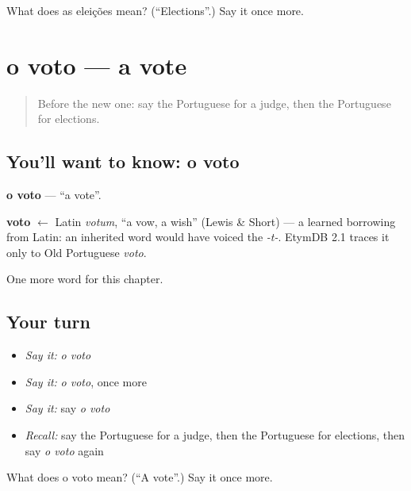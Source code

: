 \begin{tcolorbox}[breakable,colback=teal!4,colframe=teal!35!black,title={Before you move on}]
What does as eleições mean? (\textquotedblleft{}Elections\textquotedblright{}.) Say it once more.
\end{tcolorbox}
\section[o voto]{o voto — a vote}

\label{lesson:PT-C189-voto}



\begin{quote}
Before the new one: say the Portuguese for a judge, then the Portuguese for elections.
\end{quote}

\subsection*{You'll want to know: o voto}
\textbf{o voto} — \textquotedblleft{}a vote\textquotedblright{}.

\begin{cousinweb}
\textbf{voto} $\leftarrow$ Latin \emph{votum}, \textquotedblleft{}a vow, a wish\textquotedblright{} (Lewis \& Short) — a learned borrowing from Latin: an inherited word would have voiced the \emph{-t-}. EtymDB 2.1 traces it only to Old Portuguese \emph{voto}.
\end{cousinweb}

\begin{grammarlens}[title={What you've built}]
One more word for this chapter.
\end{grammarlens}

\subsection*{Your turn}
\begin{itemize}
\raggedright
  \item \emph{Say it:} \emph{o voto}
  \item \emph{Say it:} \emph{o voto}, once more
  \item \emph{Say it:} say \emph{o voto}
  \item \emph{Recall:} say the Portuguese for a judge, then the Portuguese for elections, then say \emph{o voto} again
\end{itemize}

\begin{tcolorbox}[breakable,colback=teal!4,colframe=teal!35!black,title={Before you move on}]
What does o voto mean? (\textquotedblleft{}A vote\textquotedblright{}.) Say it once more.
\end{tcolorbox}

